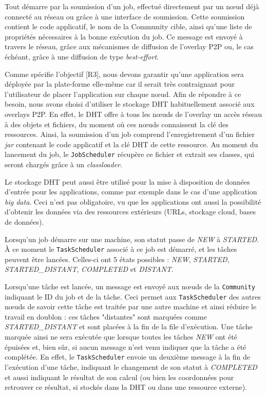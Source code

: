 Tout démarre par la soumission d'un job, effectué directement par un n{\oe}ud déjà connecté au réseau ou grâce à une interface de soumission. Cette soumission contient le code applicatif, le nom de la Community cible, ainsi qu'une liste de propriétés nécessaires à la bonne exécution du job. Ce message est envoyé à travers le réseau, grâce aux mécanismes de diffusion de l'overlay P2P ou, le cas échéant, grâce à une diffusion de type \textit{best-effort}.

Comme spécifie l'objectif [R3], nous devons garantir qu'une application sera déployée par la plate-forme elle-même car il serait très contraignant pour l'utilisateur de placer l'application sur chaque n{\oe}ud. Afin de répondre à ce besoin, nous avons choisi d'utiliser le stockage DHT habituellement associé aux overlays P2P. En effet, le DHT offre à tous les n{\oe}uds de l'overlay un accès réseau à des objets et fichiers, du moment où ces n{\oe}uds connaissent la clé des ressources. Ainsi, la soumission d'un job comprend l'enregistrement d'un fichier \textit{jar} contenant le code applicatif et la clé DHT de cette ressource. Au moment du lancement du job, le \texttt{JobScheduler} récupère ce fichier et extrait ses classes, qui seront chargés grâce à un \textit{classloader}. 

Le stockage DHT peut aussi être utilisé pour la mise à disposition de données d'entrée pour les applications, comme par exemple dans le cas d'une application \textit{big data}. Ceci n'est pas obligatoire, vu que les applications ont aussi la possibilité d'obtenir les données via des ressources extérieurs (URLs, stockage cloud, bases de données).

Lorsqu'un job démarre sur une machine, son statut passe de \textit{NEW} à \textit{STARTED}. À ce moment le \texttt{TaskScheduler} associé à ce job est démarré, et les tâches peuvent être lancées. Celles-ci ont 5 états possibles : \textit{NEW}, \textit{STARTED}, \textit{STARTED\_DISTANT}, \textit{COMPLETED} et \textit{DISTANT}. 

Lorsqu'une tâche est lancée, un message est envoyé aux n{\oe}uds de la \texttt{Community} indiquant le ID du job et de la tâche. Ceci permet aux \texttt{TaskScheduler} des autres n{\oe}uds de savoir cette tâche est traitée par une autre machine et ainsi réduire le travail en doublon : ces tâches "distantes" sont marquées comme \textit{STARTED\_DISTANT} et sont placées à la fin de la file d'exécution. Une tâche marquée ainsi ne sera exécutée que lorsque toutes les tâches \textit{NEW} ont été épuisées et, bien sûr, si aucun message n'est venu indiquer que la tâche a été complétée. En effet, le \texttt{TaskScheduler} envoie un deuxième message à la fin de l'exécution d'une tâche, indiquant le changement de son statut à \textit{COMPLETED} et aussi indiquant le résultat de son calcul (ou bien les coordonnées pour retrouver ce résultat, si stockés dans la DHT ou dans une ressource externe).

